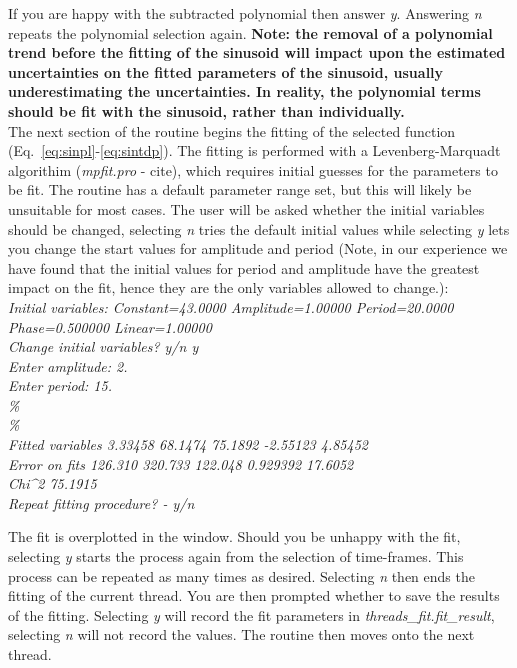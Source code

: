 \documentclass{article}
\begin{document}
If you are happy with the subtracted polynomial then answer \textit{y}. Answering \textit{n} repeats the polynomial selection again. \textbf{Note: the removal of a polynomial 
trend before the fitting of the sinusoid will impact upon the estimated uncertainties on the fitted parameters of the sinusoid, usually underestimating the uncertainties. In 
reality, the polynomial terms should be fit with the sinusoid, rather than individually.}\\

The next section of the routine begins the fitting of the selected function (Eq.~\ref{eq:sinpl}-\ref{eq:sintdp}). The fitting is performed with a Levenberg-Marquadt algorithim 
(\textit{mpfit.pro} - cite), which requires initial guesses for the parameters to be fit. The routine has a default parameter range set, but this will likely be unsuitable for most 
cases. The user will be asked whether the initial variables should be changed, selecting \textit{n} tries the default initial values while selecting \textit{y} lets you change the start values for amplitude and period (Note, in our experience we have found that the initial values for period and amplitude have the greatest impact on the fit, hence they are the only variables allowed to change.):\\

 \textit{Initial variables: Constant=43.0000 Amplitude=1.00000 Period=20.0000 Phase=0.500000 Linear=1.00000\\
Change initial variables? y/n y\\
Enter amplitude: 2.\\
Enter period: 15.\\
\%\\
\%\\
Fitted variables      3.33458      68.1474      75.1892     -2.55123      4.85452\\
Error on fits      126.310      320.733      122.048     0.929392      17.6052\\
Chi\^{}2      75.1915\\
Repeat fitting procedure? - y/n \\
}

The fit is overplotted in the window. Should you be unhappy with the fit, selecting \textit{y} starts the process again from the selection of time-frames. This process can be 
repeated as many times as desired. Selecting \textit{n} then ends the fitting of the current thread. You are then prompted whether to save the results of the fitting. Selecting 
\textit{y} will record the fit parameters in \textit{threads\_fit.fit\_result},  selecting \textit{n} will not record the values. The routine then moves onto the next thread.\\
\end{document}
